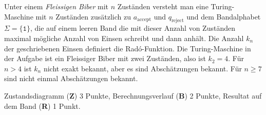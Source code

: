 \begin{diskussion}
Unter einem {\em Fleissigen Biber} mit $n$ Zuständen versteht
man eine Turing-Maschine mit $n$ Zuständen zusätzlich zu $a_{\text{accept}}$
und $q_{\text{reject}}$ und dem Bandalphabet $\Sigma=\{\texttt{1}\}$,
die auf einem leeren Band die mit dieser Anzahl von Zuständen maximal
mögliche Anzahl von Einsen schreibt und dann anhält.
Die Anzahl $k_n$ der geschriebenen Einsen definiert die Rad\'o-Funktion.
Die Turing-Maschine in der Aufgabe ist ein Fleissiger Biber mit zwei Zuständen,
also ist $k_2=4$.
Für $n>4$ ist $k_n$ nicht exakt bekannt, aber es sind Abschätzungen bekannt.
Für $n\ge 7$ sind nicht einmal Abschätzungen bekannt.
\end{diskussion}

\begin{bewertung}
Zustandsdiagramm ({\bf Z}) 3 Punkte,
Berechnungsverlauf ({\bf B}) 2 Punkte,
Resultat auf dem Band ({\bf R}) 1 Punkt.
\end{bewertung}
